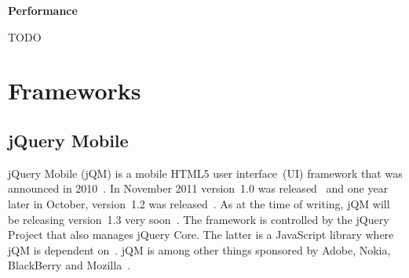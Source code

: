\documentclass[a4paper]{artikel3}
\renewcommand{\paragraph}[1]{{\bf #1} }
\begin{document}
\paragraph{Performance}%

TODO

\newpage
\section{Frameworks} %
\label{sec:frameworks}

\subsection{jQuery Mobile} %
\label{sec:jqm}

jQuery Mobile (jQM) is a mobile HTML5 user interface~(UI) framework that was announced in 2010~\cite{Resig2010}. 
In November 2011 version~1.0 was released~\cite{Parker2011} and one year later in October, version~1.2 was released~\cite{Parker2012}. 
As at the time of writing, jQM will be releasing version~1.3 very soon~\cite{Parker2013}.
The framework is controlled by the jQuery Project that also manages jQuery Core. 
The latter is a JavaScript library where jQM is dependent on~\cite{JQuery2012}. 
jQM is among other things sponsored by Adobe, Nokia, BlackBerry and Mozilla~\cite{JQuery2012a}.
\end{document}
